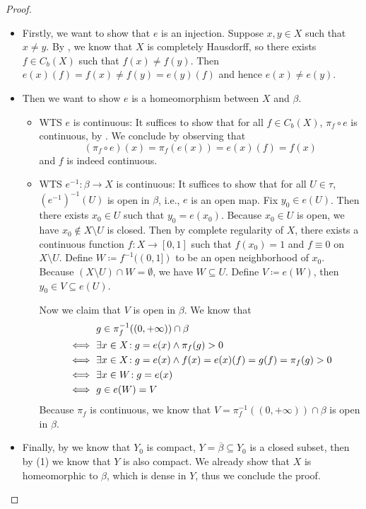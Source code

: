 \documentclass{techreport}
\begin{document}
\begin{proof}
	\begin{itemize}
		\item Firstly, we want to show that $e$ is an injection.
		Suppose $x,y \in X$ such that $x \neq y$.
		By , we know that $X$ is completely Hausdorff, so there exists $f \in C_b(X)$ such that $f(x) \neq f(y)$.
		Then $e(x)(f) = f(x) \neq f(y) = e(y)(f)$ and hence $e(x) \neq e(y)$.
		
		\item Then we want to show $e$ is a homeomorphism between $X$ and $\beta$.
		\begin{itemize}
			\item WTS $e$ is continuous: It suffices to show that for all $f \in C_b(X)$, $\pi_f \circ e$ is continuous, by .
			We conclude by observing that
			\[
			(\pi_f \circ e)(x) = \pi_f(e(x)) = e(x)(f) = f(x)
			\]
			and $f$ is indeed continuous.
			\item WTS $e^{-1} : \beta \to X$ is continuous: It suffices to show that for all $U \in \tau$, $(e^{-1})^{-1}(U)$ is open in $\beta$, i.e., $e$ is an open map.
			Fix $y_0 \in e(U)$. Then there exists $x_0 \in U$ such that $y_0 = e(x_0)$.
			Because $x_0 \in U$ is open, we have $x_0 \not\in X \setminus U$ is closed.
			Then by complete regularity of $X$, there exists a continuous function $f : X \to [0,1]$ such that $f(x_0)=1$ and $f \equiv 0$ on $X \setminus U$.
			Define $W \coloneqq f^{-1}((0,1])$ to be an open neighborhood of $x_0$.
			Because $(X \setminus U) \cap W = \emptyset$, we have $W \subseteq U$.
			Define $V \coloneqq e(W)$, then $y_0 \in V \subseteq e(U)$.
			
			Now we claim that $V$ is open in $\beta$. We know that
			\begin{align}
				& g \in \pi_f^{-1}((0,+\infty)) \cap \beta \\
				\iff~ & \exists {x \in X}\!: g = e(x) \wedge \pi_f(g) > 0 \\
				\iff~ & \exists {x \in X }\!: g=e(x) \wedge f(x)=e(x)(f)=g(f) = \pi_f(g) > 0 \\
				\iff~& \exists {x \in W}\!: g = e(x) \\
				\iff~ & g \in e(W) = V 
			\end{align}
			Because $\pi_f$ is continuous, we know that $V = \pi^{-1}_f((0,+\infty)) \cap \beta$ is open in $\beta$.
		\end{itemize}
		
		\item Finally, by  we know that $Y_0$ is compact, $Y = \overline{\beta} \subseteq Y_0$ is a closed subset, then by (1) we know that $Y$ is also compact.
		We already show that $X$ is homeomorphic to $\beta$, which is dense in $Y$, thus we conclude the proof.
	\end{itemize}
\end{proof}
\end{document}
